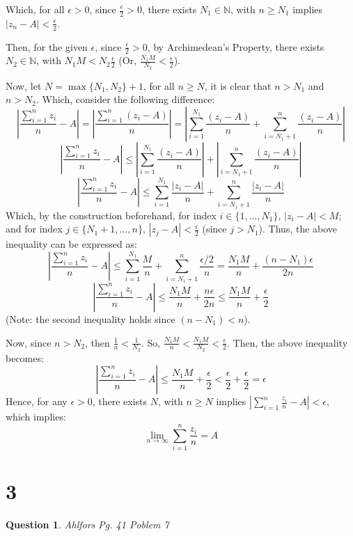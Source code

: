 \documentclass{article}
\newtheorem{question}{Question}
\begin{document}
\hfill

Which, for all $\epsilon>0$, since $\frac{\epsilon}{2}>0$, there exists $N_1\in\mathbb{N}$, with $n\geq N_1$ implies $|z_n-A|<\frac{\epsilon}{2}$.

Then, for the given $\epsilon$, since $\frac{\epsilon}{2}>0$, by Archimedean's Property, there exists $N_2\in\mathbb{N}$, with $N_1M<N_2\frac{\epsilon}{2}$
(Or, $\frac{N_1M}{N_2}<\frac{\epsilon}{2}$). 

\hfill

Now, let $N=\max\{N_1,N_2\}+1$, for all $n\geq N$, it is clear that $n>N_1$ and $n>N_2$. Which, consider the following difference:
$$\left|\frac{\sum_{i=1}^{n}z_i}{n}-A\right| = \left|\frac{\sum_{i=1}^{n}(z_i-A)}{n}\right|=\left|\sum_{i=1}^{N_1}\frac{(z_i-A)}{n}+\sum_{i=N_1+1}^{n}\frac{(z_i-A)}{n}\right|$$
$$\left|\frac{\sum_{i=1}^{n}z_i}{n}-A\right|\leq \left|\sum_{i=1}^{N_1}\frac{(z_i-A)}{n}\right|+\left|\sum_{i=N_1+1}^{n}\frac{(z_i-A)}{n}\right|$$
$$\left|\frac{\sum_{i=1}^{n}z_i}{n}-A\right|\leq \sum_{i=1}^{N_1}\frac{|z_i-A|}{n}+\sum_{i=N_1+1}^{n}\frac{|z_i-A|}{n}$$
Which, by the construction beforehand, for index $i\in\{1,...,N_1\}$, $|z_i-A|<M$; and for index $j\in\{N_1+1,...,n\}$, $|z_j-A|<\frac{\epsilon}{2}$ (since $j>N_1$).
Thus, the above inequality can be expressed as:
$$\left|\frac{\sum_{i=1}^{n}z_i}{n}-A\right|\leq \sum_{i=1}^{N_1}\frac{M}{n}+\sum_{i=N_1+1}^{n}\frac{\epsilon/2}{n} = \frac{N_1M}{n}+\frac{(n-N_1)\epsilon}{2n}$$
$$\left|\frac{\sum_{i=1}^{n}z_i}{n}-A\right|\leq \frac{N_1M}{n}+\frac{n\epsilon}{2n}\leq \frac{N_1M}{n}+\frac{\epsilon}{2}$$
(Note: the second inequality holds since $(n-N_1)<n$).

Now, since $n>N_2$, then $\frac{1}{n}<\frac{1}{N_2}$. So, $\frac{N_1M}{n}<\frac{N_1M}{N_2}<\frac{\epsilon}{2}$. 
Then, the above inequality becomes:
$$\left|\frac{\sum_{i=1}^{n}z_i}{n}-A\right|\leq \frac{N_1M}{n}+\frac{\epsilon}{2} < \frac{\epsilon}{2}+\frac{\epsilon}{2}=\epsilon$$
Hence, for any $\epsilon>0$, there exists $N$, with $n\geq N$ implies $\left|\sum_{i=1}^{n}\frac{z_i}{n}-A\right|<\epsilon$,
which implies: 
$$\lim_{n\rightarrow \infty}\sum_{i=1}^{n}\frac{z_i}{n}=A$$

\break

\section*{3}
\begin{question}
    Ahlfors Pg. 41 Poblem 7
\end{question}
\end{document}
